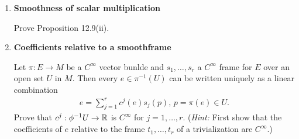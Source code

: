 \documentclass[12pt,a4paper]{report}
\newcommand{\BLUE}[1]{\textcolor{blue}{#1}}
\begin{document}
\begin{enumerate}[label=12.\arabic*]
\begin{enumerate}[label=(\alph*)]
	\BLUE{The Jacobian is the differential/pushfoward of the diffeomorphism $F: TU \to TV$ and let $T=\tilde{\psi}\circ\tilde{\phi}^{-1}$ and  
	\begin{align*}
		\tilde{x}^i &= \BINDEF{x^i & i \le n}{a^{i-n} & i > n} \\
		dT &= \sum_{i=1}^{2n}  \RBAR{\PART{T^j}{\tilde{x}^i}}_{\phi(p)} \\
		&= \sum_{i=1}^{2n}  \RBAR{\PART{\tilde{y}^j}{\tilde{x}^i}}_{\phi(p)} 
	\end{align*}We get a four quadrant matrix of the form
	\begin{align*}
		J(T) &= \PAREN{\begin{array}{cc}
			J(x,y) & J(a,y) \\
			J(x,b) & J(a,b) 
		\end{array}
		} \\
		\det J(T) &= J(x,y)J(a,b) - J(a,y)J(x,b)
	\end{align*}$J(a,y)$ and $J(x,b)$ are both zero because the vectors $a$ and $b$ are from different vector spaces than $x$ and $y$, respectively. And $J(a,b)$ is precisely $J(x,y)_{\phi(p)}$, thus
	\begin{align*}
		\det J(T(\phi(p))) &= J(x,y)_{\phi(p)}^2
	\end{align*}
	}
\end{enumerate}
	
	\item \textbf{Smoothness of scalar multiplication}
	
	Prove Proposition 12.9(ii).
	
	\item \textbf{Coefficients relative to a smoothframe}
	
	Let $\pi: E \to M$ be a $C^\infty$ vector bunlde and $s_1,\dots, s_r$ a $C^\infty$ frame for $E$ over an open set $U$ in $M$.  Then every $e \in \pi^{-1}(U)$ can be written uniquely as a linear combination
	\begin{align*}
		e = \sum_{j=1}^r c^j(e)s_j(p), \, p = \pi(e) \in U.
	\end{align*}Prove that $c^j: \phi^{-1} U \to \mathbb{R}$ is $C^\infty$ for $j=1,\dots, r$.  (\textit{Hint:} First show that the coefficients of $e$ relative to the frame $t_1, \dots, t_r$ of a trivialization are $C^\infty$.)


\end{enumerate}
\end{document}
